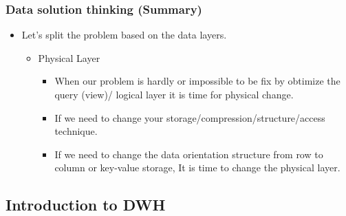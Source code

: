 \begin{frame}
  \frametitle{Data solution thinking (Summary) }
  \begin{itemize}[<+->]
  \item Let's split the problem based on the data layers.
    \begin{itemize}[<+->]
    \item Physical Layer
      \begin{itemize}[<+->]
      \item When our problem is hardly or impossible to be fix by obtimize the query (view)/ logical layer it is time for physical change.
      \item If we need to change your storage/compression/structure/access technique.
      \item If we need to change the data orientation structure from row to column or key-value storage, It is time to change the physical layer.
      \end{itemize}
    \end{itemize}
  \end{itemize}
 \end{frame}

\subsection{Introduction to DWH}

